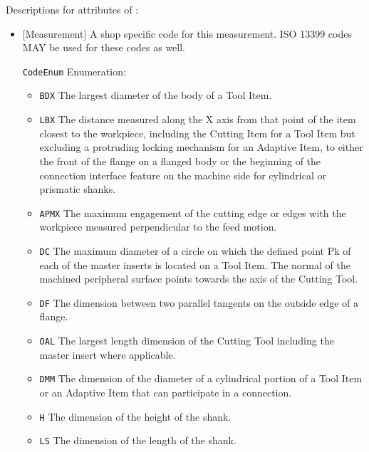 Descriptions for attributes of :

\begin{itemize}

\item {}[Measurement] \newline A shop specific code for this measurement. ISO 13399 codes MAY be used for these codes as well.

\texttt{CodeEnum} Enumeration:

\begin{itemize}
\item \texttt{BDX} \newline The largest diameter of the body of a Tool Item. 
\item \texttt{LBX} \newline The distance measured along the X axis from that point of the item closest to the workpiece, including the Cutting Item for a Tool Item but excluding a protruding locking mechanism for an Adaptive Item, to either the front of the flange on a flanged body or the beginning of the connection interface feature on the machine side for cylindrical or prismatic shanks. 
\item \texttt{APMX} \newline The maximum engagement of the cutting edge or edges with the workpiece measured perpendicular to the feed motion. 
\item \texttt{DC} \newline The maximum diameter of a circle on which the defined point Pk of each of the master inserts is located on a Tool Item. The normal of the machined peripheral surface points towards the axis of the Cutting Tool. 
\item \texttt{DF} \newline The dimension between two parallel tangents on the outside edge of a flange. 
\item \texttt{OAL} \newline The largest length dimension of the Cutting Tool including the master insert where applicable. 
\item \texttt{DMM} \newline The dimension of the diameter of a cylindrical portion of a Tool Item or an Adaptive Item that can participate in a connection. 
\item \texttt{H} \newline The dimension of the height of the shank. 
\item \texttt{LS} \newline The dimension of the length of the shank. 

\end{itemize}
\end{itemize}
